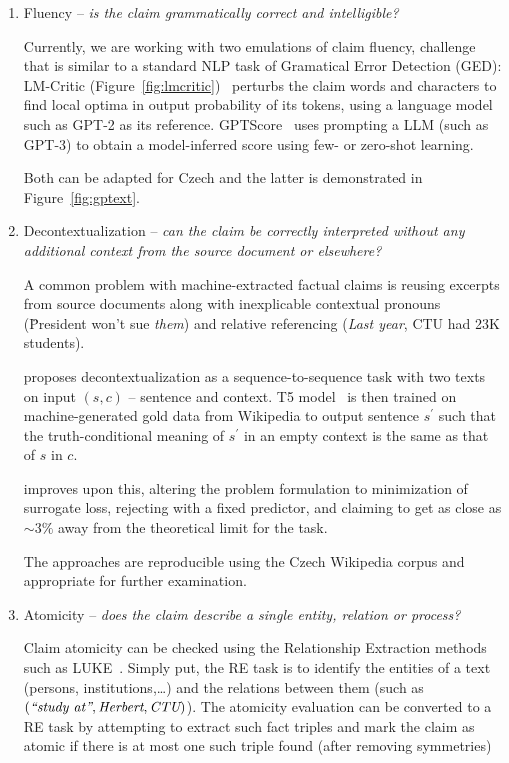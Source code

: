 \begin{enumerate}
    \item {\techbf Fluency} -- \textit{is the claim grammatically correct and intelligible?}
    
    Currently, we are working with two emulations of claim fluency, challenge that is similar to a standard NLP task of Gramatical Error Detection (GED): \textsf{LM-Critic} (Figure~\ref{fig:lmcritic})~\cite{yasunaga-etal-2021-lm} perturbs the claim words and characters to find local optima in output probability of its tokens, using a language model such as GPT-2 as its reference. \textsf{GPTScore}~\cite{fu2023gptscore} uses prompting a LLM (such as GPT-3) to obtain a model-inferred score using few- or zero-shot learning.
    
    Both can be adapted for Czech and the latter is demonstrated in Figure~\ref{fig:gptext}.
    \item {\techbf Decontextualization} -- \textit{can the claim be correctly interpreted without any additional context from the source document or elsewhere?}
    
    A common problem with machine-extracted factual claims is reusing excerpts from source documents along with inexplicable contextual pronouns (\"{President won't sue \textit{them}}) and relative referencing (\"{\textit{Last year}, CTU had 23K students}).

\cite{choi-etal-2021-decontextualization} proposes decontextualization as a sequence-to-sequence task with two texts on input $(s,c)$ -- sentence and context.
    T5 model~\cite{t5-11b} is then trained on machine-generated gold data from Wikipedia to output sentence $s^\prime$ such that the truth-conditional meaning of $s^\prime$ in an empty context is the same as that of $s$ in $c$.

    \cite{mohri2023learning} improves upon this, altering the problem formulation to minimization of surrogate loss, rejecting with a fixed predictor, and claiming to get as close as $\sim3\%$ away from the theoretical limit for the task.

    The approaches are reproducible using the Czech Wikipedia corpus and appropriate for further examination.

    \item {\techbf Atomicity} --  \textit{does the claim describe a single entity, relation or process?}
    \label{atomicity}
    
    Claim atomicity can be checked using the Relationship Extraction methods such as LUKE~\cite{yamada2020luke}. Simply put, the RE task is to identify the entities of a text (persons, institutions,\dots) and the relations between them (such as $(\textit{\"{study at}}, \textit{Herbert}, \textit{CTU})$). The atomicity evaluation can be converted to a RE task by attempting to extract such fact triples and mark the claim as atomic if there is at most one such triple found (after removing symmetries)


\end{enumerate}
